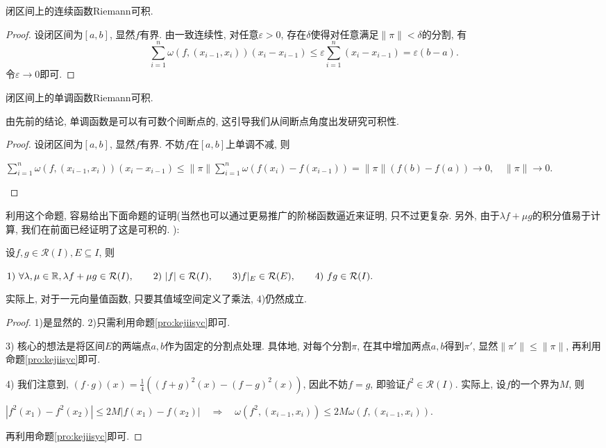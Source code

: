 \begin{corollary}{}
	闭区间上的连续函数Riemann可积. 
\end{corollary}
\begin{proof}
	设闭区间为$[a,b]$, 显然$f$有界. 由一致连续性, 对任意$\varepsilon >0$, 存在$\delta$使得对任意满足$\| \pi \| <\delta$的分割, 有$$\sum_{i=1}^{n} \omega (f,(x_{i-1},x_i)) (x_i-x_{i-1}) \leq \varepsilon \sum_{i=1}^{n} (x_i-x_{i-1}) = \varepsilon (b-a).$$
	令$\varepsilon \to 0$即可. 
\end{proof}

\begin{corollary}{}
	闭区间上的单调函数Riemann可积. 
\end{corollary}
\begin{remark}
	由先前的结论, 单调函数是可以有可数个间断点的, 这引导我们从间断点角度出发研究可积性. 
\end{remark}
\begin{proof}
	设闭区间为$[a,b]$, 显然$f$有界. 不妨$f$在$[a,b]$上单调不减, 则
	\begin{center}
		$\displaystyle \sum_{i=1}^{n} \omega (f,(x_{i-1},x_i)) (x_i-x_{i-1}) \leq \| \pi \| \sum_{i=1}^{n} \omega (f(x_i)-f(x_{i-1})) = \| \pi \| (f(b)-f(a)) \to 0,\quad \| \pi \| \to 0.$
	\end{center}
\end{proof}


利用这个命题, 容易给出下面命题的证明(当然也可以通过更易推广的阶梯函数逼近来证明, 只不过更复杂. 另外, 由于$\lambda f+ \mu g$的积分值易于计算, 我们在前面已经证明了这是可积的. ): 

\begin{proposition}{} \label{pro:jiffxkvi}
	设$f,g \in \mathcal{R}(I), E \subseteq I$, 则
	\begin{center}
		$1)~\forall \lambda ,\mu \in \mathbb{R} ,\lambda f+\mu g \in \mathcal{R}(I),\qquad 2)~|f| \in \mathcal{R}(I),\qquad 3) f|_E \in \mathcal{R}(E),\qquad 4)~fg \in \mathcal{R}(I).$
	\end{center}
\end{proposition}
\begin{remark}
	实际上, 对于一元向量值函数, 只要其值域空间定义了乘法, 4)仍然成立. 
\end{remark}
\begin{proof}
	1)是显然的. 2)只需利用命题\ref{pro:kejiisyc}即可. 
	
	3) 核心的想法是将区间$E$的两端点$a,b$作为固定的分割点处理. 具体地, 对每个分割$\pi$, 在其中增加两点$a,b$得到$\pi '$, 显然$\| \pi ' \| \leq \| \pi \|$, 再利用命题\ref{pro:kejiisyc}即可. 
	
	4) 我们注意到, $(f \cdot g)(x) = \frac{1}{4}((f+g)^2(x)-(f-g)^2(x))$, 因此不妨$f=g$, 即验证$f^2 \in \mathcal{R}(I)$. 实际上, 设$f$的一个界为$M$, 则
	\begin{center}
		$|f^2(x_1)-f^2(x_2)| \leq 2M|f(x_1)-f(x_2)| \quad \Rightarrow \quad \omega (f^2,(x_{i-1},x_i)) \leq 2M\omega (f,(x_{i-1},x_i)).$
	\end{center}
	再利用命题\ref{pro:kejiisyc}即可. 
\end{proof}

